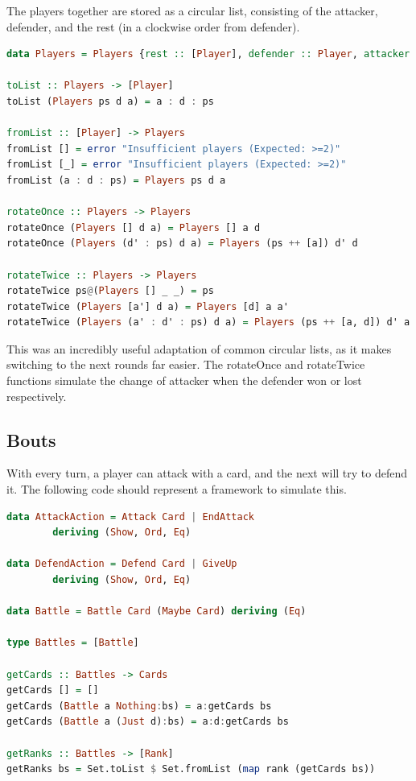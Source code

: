 \documentclass[a4paper, twoside, 12pt]{report}
\begin{document}
The players together are stored as a circular list, consisting of the attacker, defender, and the rest (in a clockwise order from defender).

\begin{lstlisting}[language=Haskell]
data Players = Players {rest :: [Player], defender :: Player, attacker :: Player} deriving (Eq, Show)

toList :: Players -> [Player]
toList (Players ps d a) = a : d : ps

fromList :: [Player] -> Players
fromList [] = error "Insufficient players (Expected: >=2)"
fromList [_] = error "Insufficient players (Expected: >=2)"
fromList (a : d : ps) = Players ps d a

rotateOnce :: Players -> Players
rotateOnce (Players [] d a) = Players [] a d
rotateOnce (Players (d' : ps) d a) = Players (ps ++ [a]) d' d

rotateTwice :: Players -> Players
rotateTwice ps@(Players [] _ _) = ps
rotateTwice (Players [a'] d a) = Players [d] a a'
rotateTwice (Players (a' : d' : ps) d a) = Players (ps ++ [a, d]) d' a'
\end{lstlisting}

This was an incredibly useful adaptation of common circular lists, as it makes switching to the next rounds far easier. The rotateOnce and rotateTwice functions simulate the change of attacker when the defender won or lost respectively.

\subsection{Bouts}

With every turn, a player can attack with a card, and the next will try to defend it. The following code should represent a framework to simulate this.

\begin{lstlisting}[language=Haskell]
data AttackAction = Attack Card | EndAttack
        deriving (Show, Ord, Eq)

data DefendAction = Defend Card | GiveUp
        deriving (Show, Ord, Eq)

data Battle = Battle Card (Maybe Card) deriving (Eq)

type Battles = [Battle]

getCards :: Battles -> Cards
getCards [] = []
getCards (Battle a Nothing:bs) = a:getCards bs
getCards (Battle a (Just d):bs) = a:d:getCards bs

getRanks :: Battles -> [Rank]
getRanks bs = Set.toList $ Set.fromList (map rank (getCards bs))

\end{lstlisting}
\end{document}
